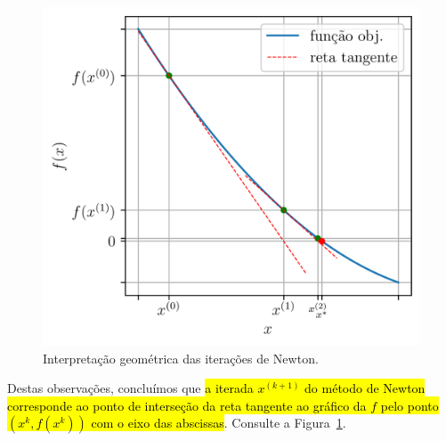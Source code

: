 \begin{figure}[H]
  \centering
  \includegraphics[width=\textwidth]{./cap_eq1d/dados/fig_Newton_geointerp/fig}
  \caption{Interpretação geométrica das iterações de Newton.}
  \label{cap_eq1d_sec_newton:fig:Newton_geointerp}
\end{figure}

Destas observações, concluímos que \hl{a iterada $x^{(k+1)}$ do método de Newton corresponde ao ponto de interseção da reta tangente ao gráfico da $f$ pelo ponto $(x^{k}, f(x^{k}))$ com o eixo das abscissas}. Consulte a Figura~\ref{cap_eq1d_sec_newton:fig:Newton_geointerp}.

